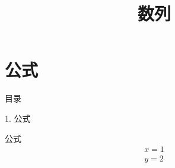 \documentclass[aspectratio=169,10pt,fontset=fandol]{ctexbeamer}
\title{数列}
\begin{document}
\section{公式}
\begin{frame}[t,fragile]{目录}
\normalsize
{\color{blue}\normalsize 1. 公式\par}\vspace{0.22em}
\end{frame}
\begin{frame}[t,fragile]{公式}
\normalsize
{\normalsize
\[\boxed{\begin{array}{c}x=1\\y=2\end{array}}\]
}
\end{frame}
\end{document}
